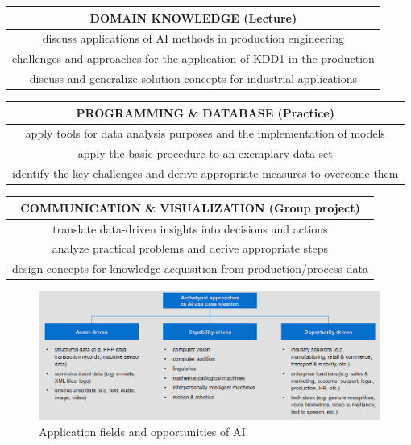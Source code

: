 \documentclass[12pt, a4paper, oneside, justified]{article}
\begin{document}
\begin{table}[!h]
\centering
\begin{tabular}{c}
    DOMAIN KNOWLEDGE (Lecture) \\
    \hline
    discuss applications of AI methods in production engineering \\
    challenges and approaches for the application of KDD1 in the production \\
    discuss and generalize solution concepts for industrial applications
\end{tabular}
\end{table}

\begin{table}[!h]
\centering
\begin{tabular}{c}
    PROGRAMMING \& DATABASE (Practice) \\
    \hline
    apply tools for data analysis purposes and the implementation of models \\
    apply the basic procedure to an exemplary data set \\
    identify the key challenges and derive appropriate measures to overcome them
\end{tabular}
\end{table}

\begin{table}[!h]
\centering
\begin{tabular}{c}
    COMMUNICATION \& VISUALIZATION (Group project) \\
    \hline
    translate data-driven insights into decisions and actions \\
    analyze practical problems and derive appropriate steps \\
    design concepts for knowledge acquisition from production/process data
\end{tabular}
\end{table}

\begin{figure}[!h]
    \centering
    \includegraphics[scale=0.8]{../img/1-10.png}
    \caption{Application fields and opportunities of AI}
    \label{img/1-10}
\end{figure}
\end{document}
